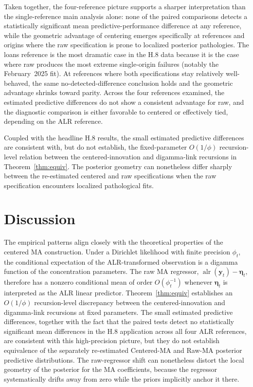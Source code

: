 \documentclass[12pt]{article}
\theoremstyle{remark}
\newcommand{\alr}{\operatorname{alr}}
\newcommand{\bfeta}{\boldsymbol{\eta}}
\newcommand{\bfy}{\mathbf{y}}
\begin{document}
Taken together, the four-reference picture supports a sharper interpretation than the single-reference main analysis alone: none of the paired comparisons detects a statistically significant mean predictive-performance difference at any reference, while the geometric advantage of centering emerges specifically at references and origins where the raw specification is prone to localized posterior pathologies. The loans reference is the most dramatic case in the H.8 data because it is the case where raw produces the most extreme single-origin failures (notably the February~2025 fit). At references where both specifications stay relatively well-behaved, the same no-detected-difference conclusion holds and the geometric advantage shrinks toward parity. Across the four references examined, the estimated predictive differences do not show a consistent advantage for raw, and the diagnostic comparison is either favorable to centered or effectively tied, depending on the ALR reference.

Coupled with the headline H.8 results, the small estimated predictive differences are consistent with, but do not establish, the fixed-parameter $O(1/\phi)$ recursion-level relation between the centered-innovation and digamma-link recursions in Theorem~\ref{thm:equiv}. The posterior geometry can nonetheless differ sharply between the re-estimated centered and raw specifications when the raw specification encounters localized pathological fits.

\FloatBarrier

\section{Discussion}\label{sec:discussion}

The empirical patterns align closely with the theoretical properties of the centered MA construction. Under a Dirichlet likelihood with finite precision $\phi_t$, the conditional expectation of the ALR-transformed observation is a digamma function of the concentration parameters. The raw MA regressor, $\alr(\bfy_t)-\bfeta_t$, therefore has a nonzero conditional mean of order $O(\phi_t^{-1})$ whenever $\bfeta_t$ is interpreted as the ALR linear predictor. Theorem~\ref{thm:equiv} establishes an $O(1/\phi)$ recursion-level discrepancy between the centered-innovation and digamma-link recursions at fixed parameters. The small estimated predictive differences, together with the fact that the paired tests detect no statistically significant mean differences in the H.8 application across all four ALR references, are consistent with this high-precision picture, but they do not establish equivalence of the separately re-estimated Centered-MA and Raw-MA posterior predictive distributions. The raw-regressor shift can nonetheless distort the local geometry of the posterior for the MA coefficients, because the regressor systematically drifts away from zero while the priors implicitly anchor it there.
\end{document}

